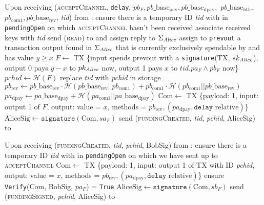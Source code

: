 \begin{algorithmic}[1]
    \State Upon receiving (\textsc{acceptChannel}, \texttt{delay}, $pb_F,
    pb\_\mathrm{base}_{\mathrm{pay}}, pb\_\mathrm{base}_{\mathrm{dpay}},$
    $pb\_\mathrm{base}_{\mathrm{htlc}},$ $pb_{\mathrm{com}1},
    pb\_\mathrm{base}_{\mathrm{rev}}$, \textit{tid}) from \bob:
    \Indent
      \State ensure there is a temporary ID \textit{tid} with \bob{} in
      \texttt{pendingOpen} on which \textsc{acceptChannel} hasn't been received
      \State associate received keys with \textit{tid}
      \State send (\textsc{read}) to \ledger{} and assign reply to
      $\Sigma_{\mathit{Alice}}$
      \State assign to \texttt{prevout} a transaction output found in
      $\Sigma_{\mathit{Alice}}$ that is currently exclusively spendable by \alice{} and
      has value $y \geq x$
      \State $F \gets$ TX \{input spends prevout with a \texttt{signature}(TX,
      $sk_{\mathit{Alice}}$), output 0 pays $y - x$ to $pk_{\mathit{Alice}}$ now, output 1 pays
      $x$ to $\textit{tid}.pa_F \wedge pb_F$ now\}
      \State $\mathit{pchid} \gets \mathcal{H}\left(F\right)$
      \State replace \textit{tid} with \textit{pchid} in storage
      \State $pb_{\mathrm{rev}} \gets pb\_\mathrm{base}_{\mathrm{rev}} \cdot
      \mathcal{H}\left(pb\_\mathrm{base}_{\mathrm{rev}} ||
      pb_{\mathrm{com}1}\right) + pb_{\mathrm{com}1} \cdot \mathcal{H}\left(
      pb_{\mathrm{com}1} || pb\_\mathrm{base}_{\mathrm{rev}}\right)$
      \State $pa_{\mathrm{dpay}} \gets pa\_\mathrm{base}_{\mathrm{dpay}} +
      \mathcal{H}\left(pa_{\mathrm{com}1} ||
      pa\_\mathrm{base}_{\mathrm{dpay}}\right)$
      \State $\mathrm{Com} \gets$ TX \{payload: 1, input: output 1 of $F$,
      output: value = $x$, methods = $pb_{\mathrm{rev}},
      \left(pa_{\mathrm{dpay}}, \mathtt{delay} \text{ relative}\right)$\}
      \State $\mathrm{AliceSig} \gets \mathtt{signature}\left(\mathrm{Com},
      sa_F\right)$
      \State send (\textsc{fundingCreated}, \textit{tid},
      \textit{pchid}, AliceSig) to \bob
    \EndIndent
    \State

    \State Upon receiving (\textsc{fundingCreated}, \textit{tid},
    \textit{pchid}, BobSig) from \bob:
    \Indent
      \State ensure there is a temporary ID \textit{tid} with \bob{} in
      \texttt{pendingOpen} on which we have sent up to \textsc{acceptChannel}
      \State $\mathrm{Com} \gets$ TX \{payload: 1, input: output 1 of TX with ID
      \textit{pchid}, output: value = $x$, methods = $pb_{\mathrm{rev}},
      \left(pa_{\mathrm{dpay}}, \mathtt{delay} \text{ relative}\right)$\}
      \State ensure \texttt{Verify}(Com, BobSig, $pa_F$) = \texttt{True}
      \State $\mathrm{AliceSig} \gets \mathtt{signature}\left(\mathrm{Com},
      sb_F\right)$
      \State send (\textsc{fundingSigned}, \textit{pchid}, AliceSig) to \bob
    \EndIndent
    \State


\end{algorithmic}
